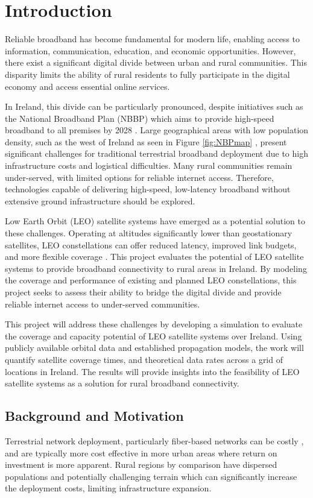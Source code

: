 \chapter{Introduction} \label{chapter:1}
Reliable broadband has become fundamental for modern life, enabling access to information, communication, education, and economic opportunities. However, there exist a significant digital divide between urban and rural communities. This disparity limits the ability of rural residents to fully participate in the digital economy and access essential online services.

In Ireland, this divide can be particularly pronounced, despite initiatives such as the National Broadband Plan (NBBP) which aims to provide high-speed broadband to all premises by 2028 \cite{NBPPolicy}. Large geographical areas with low population density, such as the west of Ireland as seen in Figure \ref{fig:NBPmap} \cite{NBPMap}, present significant challenges for traditional terrestrial broadband deployment due to high infrastructure costs and logistical difficulties. Many rural communities remain under-served, with limited options for reliable internet access. Therefore, technologies capable of delivering high-speed, low-latency broadband without extensive ground infrastructure should be explored. 

Low Earth Orbit (LEO) satellite systems have emerged as a potential solution to these challenges. Operating at altitudes significantly lower than geostationary satellites, LEO constellations can offer reduced latency, improved link budgets, and more flexible coverage \cite{esaOrbits}. This project evaluates the potential of LEO satellite systems to provide broadband connectivity to rural areas in Ireland. By modeling the coverage and performance of existing and planned LEO constellations, this project seeks to assess their ability to bridge the digital divide and provide reliable internet access to under-served communities.

This project will address these challenges by developing a simulation to evaluate the coverage and capacity potential of LEO satellite systems over Ireland. Using publicly available orbital data and established propagation models, the work will quantify satellite coverage times, and theoretical data rates across a grid of locations in Ireland. The results will provide insights into the feasibility of LEO satellite systems as a solution for rural broadband connectivity.

\section{Background and Motivation}
Terrestrial network deployment, particularly fiber-based networks can be costly \cite{Michael2025BroadbandCost}, and are typically more cost effective in more urban areas where return on investment is more apparent. Rural regions by comparison have dispersed populations and potentially challenging terrain which can significantly increase the deployment costs, limiting infrastructure expansion. 

